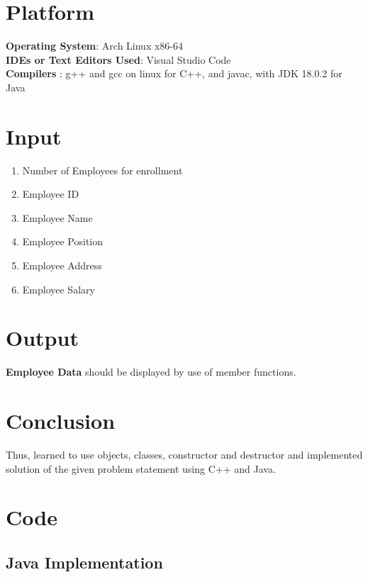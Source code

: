 \documentclass[11pt]{article}
\begin{document}
\section{Platform}
	\textbf{Operating System}: Arch Linux x86-64\\
	\textbf{IDEs or Text Editors Used}: Visual Studio Code\\
	\textbf{Compilers} : g++ and gcc on linux for C++, and javac, with JDK 18.0.2 for Java\\

\section{Input}

\begin{enumerate}
	\item Number of Employees for enrollment
	\item Employee ID
	\item Employee Name
	\item Employee Position
	\item Employee Address
	\item Employee Salary
\end{enumerate}

\section{Output}

\textbf{Employee Data} should be displayed by use of member functions. 

\section{Conclusion}
Thus, learned to use objects, classes, constructor and destructor and implemented solution
of the given problem statement using C++ and Java.

\section{Code}

\subsection{Java Implementation}




\end{document}
